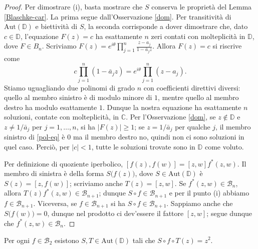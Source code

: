\begin{proof}
  Per dimostrare (i), basta mostrare che $S$ conserva le proprietà del Lemma \ref{Blaschke-car}. La prima segue dall'Osservazione \ref{dom}. Per transitività di $\text{Aut}(\mathbb{D})$ e biettività di $S$, la seconda corrisponde a dover dimostrare che, dato $c \in \mathbb{D}$, l'equazione $F(z)=c$ ha esattamente $n$ zeri contati con molteplicità in $\mathbb{D}$, dove $F \in B_n$. Scriviamo $F(z)=\displaystyle e^{i\theta}\prod_{j=1}^n \frac{z-a_j}{1-\bar{a}_jz}$. Allora $F(z)=c$ si riscrive come
  \begin{equation} \label{pol-eq}
    c\prod_{j=1}^n (1-\bar{a}_jz)=e^{i\theta}\prod_{j=1}^n(z-a_j).
  \end{equation}
  Stiamo uguagliando due polinomi di grado $n$ con coefficienti direttivi diversi: quello al membro sinistro è di modulo minore di $1$, mentre quello al membro destro ha modulo esattamente $1$. Dunque la nostra equazione ha esattamente $n$ soluzioni, contate con molteplicità, in $\mathbb{C}$.
  Per l'Osservazione \ref{dom}, se $z \not\in \mathbb{D}$ e $z\not=1/\bar{a}_j$ per $j=1,\dots,n$, si ha $|F(z)| \ge 1$; se $z=1/\bar{a}_j$ per qualche $j$, il membro sinistro di \eqref{pol-eq} è $0$ ma il membro destro no, quindi non ci sono soluzioni in quel caso. Perciò, per $|c|<1$, tutte le soluzioni trovate sono in $\mathbb{D}$ come voluto.

  Per definizione di quoziente iperbolico, $[f(z),f(w)]=[z,w]f^*(z,w)$. Il membro di sinistra è della forma $S\bigl(f(z)\bigr)$, dove $S \in \text{Aut}(\mathbb{D})$ è $S(z)=[z,f(w)]$; scriviamo anche $T(z)=[z,w]$.
  Se $f^*(z,w) \in \mathcal{B}_n$, allora $T(z)f^*(z,w) \in \mathcal{B}_{n+1}$; dunque $S\circ f \in \mathcal{B}_{n+1}$ e per il punto (i) abbiamo $f \in \mathcal{B}_{n+1}$. Viceversa, se $f \in \mathcal{B}_{n+1}$ si ha $S\circ f \in \mathcal{B}_{n+1}$.
  Sappiamo anche che $S\bigl(f(w)\bigr)=0$, dunque nel prodotto ci dev'essere il fattore $[z,w]$; segue dunque che $f^*(z,w) \in \mathcal{B}_n$.
\end{proof}

\begin{lm} \label{z^2}
  Per ogni $f \in \mathcal{B}_2$ esistono $S, T \in \text{Aut}(\mathbb{D})$ tali che $S\circ f\circ T(z)=z^2$.
\end{lm}

